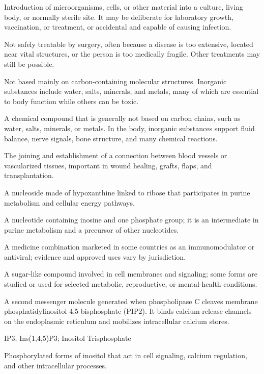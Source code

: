  Introduction of microorganisms, cells, or other material into a culture, living body, or normally sterile site. It may be deliberate for laboratory growth, vaccination, or treatment, or accidental and capable of causing infection.

 Not safely treatable by surgery, often because a disease is too extensive, located near vital structures, or the person is too medically fragile. Other treatments may still be possible.

 Not based mainly on carbon-containing molecular structures. Inorganic substances include water, salts, minerals, and metals, many of which are essential to body function while others can be toxic.

 A chemical compound that is generally not based on carbon chains, such as water, salts, minerals, or metals. In the body, inorganic substances support fluid balance, nerve signals, bone structure, and many chemical reactions.

 The joining and establishment of a connection between blood vessels or vascularized tissues, important in wound healing, grafts, flaps, and transplantation.

 A nucleoside made of hypoxanthine linked to ribose that participates in purine metabolism and cellular energy pathways.

 A nucleotide containing inosine and one phosphate group; it is an intermediate in purine metabolism and a precursor of other nucleotides.

 A medicine combination marketed in some countries as an immunomodulator or antiviral; evidence and approved uses vary by jurisdiction.

 A sugar-like compound involved in cell membranes and signaling; some forms are studied or used for selected metabolic, reproductive, or mental-health conditions.

 A second messenger molecule generated when phospholipase C cleaves membrane phosphatidylinositol 4,5-bisphosphate (PIP2). It binds calcium-release channels on the endoplasmic reticulum and mobilizes intracellular calcium stores.

\synonyms
IP3; Ins(1,4,5)P3; Inositol Trisphosphate

 Phosphorylated forms of inositol that act in cell signaling, calcium regulation, and other intracellular processes.

